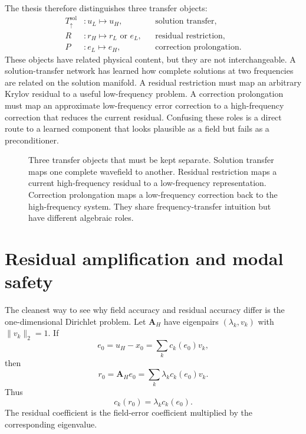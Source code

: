 The thesis therefore distinguishes three transfer objects:
\begin{align}
    T_{\uparrow}^{\mathrm{sol}} &: u_L \mapsto u_H,
    &&\text{solution transfer}, \label{eq:ch5-three-objects-solution}\\
    R &: r_H \mapsto r_L \text{ or } e_L,
    &&\text{residual restriction}, \label{eq:ch5-three-objects-restriction}\\
    P &: e_L \mapsto e_H,
    &&\text{correction prolongation}. \label{eq:ch5-three-objects-prolongation}
\end{align}
These objects have related physical content, but they are not interchangeable.
A solution-transfer network has learned how complete solutions at two
frequencies are related on the solution manifold. A residual restriction must
map an arbitrary Krylov residual to a useful low-frequency problem. A
correction prolongation must map an approximate low-frequency error correction
to a high-frequency correction that reduces the current residual. Confusing
these roles is a direct route to a learned component that looks plausible as a
field but fails as a preconditioner.

\begin{figure}[htbp]
    \centering
    \caption{Three transfer objects that must be kept separate. Solution
    transfer maps one complete wavefield to another. Residual restriction maps
    a current high-frequency residual to a low-frequency representation.
    Correction prolongation maps a low-frequency correction back to the
    high-frequency system. They share frequency-transfer intuition but have
    different algebraic roles.}
    \label{fig:ch5-three-transfer-objects}
\end{figure}

\section{Residual amplification and modal safety}
\label{sec:ch5-modal-safety}

The cleanest way to see why field accuracy and residual accuracy differ is the
one-dimensional Dirichlet problem. Let $\mathbf{A}_H$ have eigenpairs
$(\lambda_k,v_k)$ with $\|v_k\|_2=1$. If
\begin{equation}
    e_0
    =
    u_H-x_0
    =
    \sum_k c_k(e_0)v_k,
    \label{eq:ch5-error-expansion}
\end{equation}
then
\begin{equation}
    r_0
    =
    \mathbf{A}_H e_0
    =
    \sum_k \lambda_k c_k(e_0)v_k.
    \label{eq:ch5-residual-expansion}
\end{equation}
Thus
\begin{equation}
    c_k(r_0)
    =
    \lambda_k c_k(e_0).
    \label{eq:ch5-modal-amplification}
\end{equation}
The residual coefficient is the field-error coefficient multiplied by the
corresponding eigenvalue.

